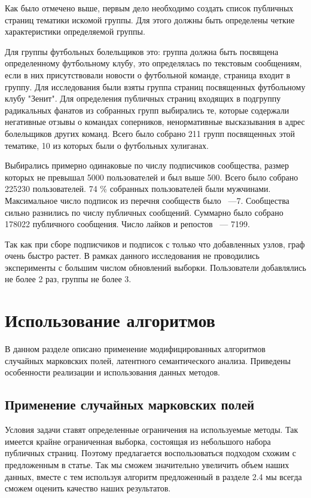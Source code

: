 \documentclass[annotation,times,page4]{itmo-student-thesis}
\begin{document}
Как было отмечено выше, первым дело необходимо создать список публичных страниц тематики искомой группы. 
Для этого должны быть определены четкие характеристики определяемой группы.

Для группы футбольных болельщиков это: группа должна быть посвящена определенному футбольному клубу, это определялась по текстовым сообщениям, если в них присутствовали новости о футбольной команде, страница входит в группу. Для исследования были взяты группа страниц посвященных футбольному клубу "Зенит". Для определения публичных страниц входящих в подгруппу радикальных фанатов из собранных групп выбирались те, которые  содержали негативные отзывы о командах соперников, ненормативные высказывания в адрес болельщиков других команд. Всего было собрано 211 групп посвященных этой тематике, 10 из которых были о футбольных хулиганах.

Выбирались примерно одинаковые по числу подписчиков сообщества, размер которых не превышал 5000 пользователей и был выше 500. Всего было собрано 225230 пользователей. 74 \% собранных пользователей были мужчинами. Максимальное число подписок из перечня сообществ было ~---7. Сообщества сильно разнились по числу публичных сообщений. Суммарно было собрано 178022 публичного сообщения. Число лайков и репостов ~--- 7199.

Так как при сборе подписчиков и подписок с только что добавленных узлов, граф очень быстро растет. В рамках данного исследования не проводились эксперименты с большим числом обновлений выборки. Пользователи добавлялись не более 2 раз, группы не более 3.



\section{Использование алгоритмов}
В данном разделе описано применение модифицированных алгоритмов случайных марковских полей, латентного семантического анализа. Приведены особенности реализации и использования данных методов.
\subsection{Применение случайных марковских полей}
Условия задачи ставят определенные ограничения на используемые методы. Так имеется крайне ограниченная выборка, состоящая из небольшого набора публичных страниц. Поэтому предлагается воспользоваться подходом схожим с предложенным в статье. Так мы сможем значительно увеличить объем наших данных, вместе с тем используя алгоритм предложенный в разделе 2.4 мы всегда сможем оценить качество наших результатов.
\end{document}
